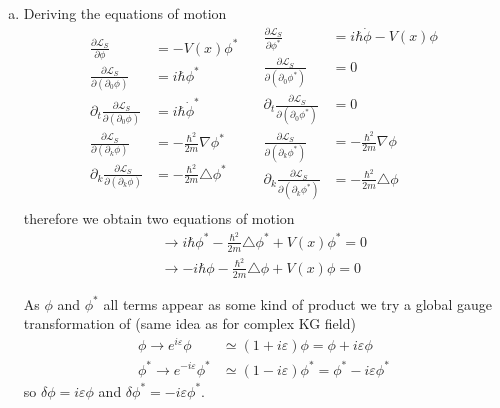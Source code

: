 \documentclass[../main.tex]{subfiles}
\begin{document}
\begin{enumerate}[(a)]
\item Deriving the equations of motion
\begin{equation}
 \begin{split}
\frac{\partial\mathcal{L}_{S}}{\partial\phi}&=-V(x)\phi^* \\
\frac{\partial\mathcal{L}_{S}}{\partial(\partial_0\phi)}&=i\hbar\phi^*\\
\partial_t\frac{\partial\mathcal{L}_{S}}{\partial(\partial_0\phi)}&=i\hbar\dot{\phi}^*\\
\frac{\partial\mathcal{L}_{S}}{\partial(\partial_k\phi)}&=-\frac{\hbar^2}{2m}\nabla\phi^*\\
\partial_k\frac{\partial\mathcal{L}_{S}}{\partial(\partial_k\phi)}&=-\frac{\hbar^2}{2m}\triangle\phi^*\\
 \end{split}
 \quad
 \begin{split}
\frac{\partial\mathcal{L}_{S}}{\partial\phi^*}&=i\hbar\dot{\phi}-V(x)\phi \\
\frac{\partial\mathcal{L}_{S}}{\partial(\partial_0\phi^*)}&=0\\
\partial_t\frac{\partial\mathcal{L}_{S}}{\partial(\partial_0\phi^*)}&=0\\
\frac{\partial\mathcal{L}_{S}}{\partial(\partial_k\phi^*)}&=-\frac{\hbar^2}{2m}\nabla\phi\\
\partial_k\frac{\partial\mathcal{L}_{S}}{\partial(\partial_k\phi^*)}&=-\frac{\hbar^2}{2m}\triangle\phi\\
 \end{split} 
\end{equation}
therefore we obtain two equations of motion
\begin{align}
\rightarrow i\hbar\phi^*-\frac{\hbar^2}{2m}\triangle\phi^*+V(x)\phi^*=0\\
\rightarrow -i\hbar\phi-\frac{\hbar^2}{2m}\triangle\phi+V(x)\phi=0
\end{align}

As $\phi$ and $\phi^*$ all terms appear as some kind of product we try a global gauge transformation of (same idea as for complex KG field)
\begin{align}
\phi\rightarrow e^{i\varepsilon}\phi&\simeq(1+i\varepsilon)\phi=\phi+i\varepsilon\phi\\
\phi^*\rightarrow e^{-i\varepsilon}\phi^*&\simeq(1-i\varepsilon)\phi^*=\phi^*-i\varepsilon\phi^*
\end{align}
so $\delta\phi=i\varepsilon\phi$ and $\delta\phi^*=-i\varepsilon\phi^*$.


\end{enumerate}
\end{document}
